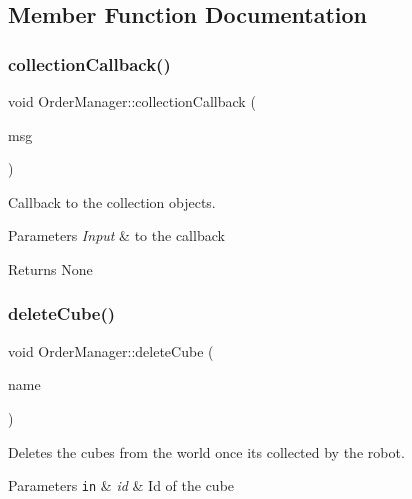 \subsection{Member Function Documentation}
\mbox{\label{class_order_manager_a13daaebc0fb01ad6da98386c8888633a}} 
\subsubsection{\texorpdfstring{collection\+Callback()}{collectionCallback()}}
{\footnotesize\ttfamily void Order\+Manager\+::collection\+Callback (\begin{DoxyParamCaption}\item[{const ros\+\_\+collection\+\_\+robot\+::\+Cube\+::\+Const\+Ptr \&}]{msg }\end{DoxyParamCaption})}



Callback to the collection objects. 


\begin{DoxyParams}{Parameters}
{\em Input} & to the callback \\
\hline
\end{DoxyParams}
\begin{DoxyReturn}{Returns}
None 
\end{DoxyReturn}
\mbox{\label{class_order_manager_af6abc7332447e88fe60c87f1f7e57add}} 
\subsubsection{\texorpdfstring{delete\+Cube()}{deleteCube()}}
{\footnotesize\ttfamily void Order\+Manager\+::delete\+Cube (\begin{DoxyParamCaption}\item[{std\+::string}]{name }\end{DoxyParamCaption})}



Deletes the cubes from the world once its collected by the robot. 


\begin{DoxyParams}[1]{Parameters}
\mbox{\tt in}  & {\em id} & Id of the cube \\
\hline
\end{DoxyParams}
\mbox{\label{class_order_manager_ace7dbb29e033a5e381d50f0d302243c1}} 
